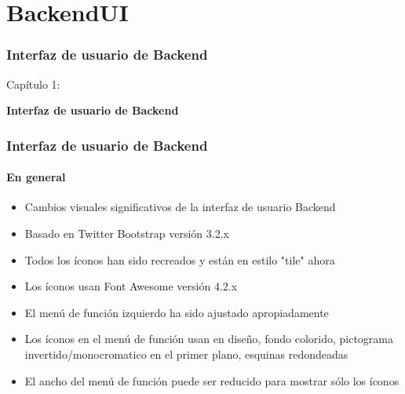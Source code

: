 %

\section{BackendUI}
\begin{frame}[fragile]
	\frametitle{Interfaz de usuario de Backend}

	\begin{center}\huge{Capítulo 1:}\end{center}
	\begin{center}\huge{\color{typo3darkgrey}\textbf{Interfaz de usuario de Backend}}\end{center}

\end{frame}


\begin{frame}[fragile]
	\frametitle{Interfaz de usuario de Backend}
	\framesubtitle{En general}

	\begin{itemize}
		\item Cambios visuales significativos de la interfaz de usuario Backend
		\item Basado en Twitter Bootstrap versión 3.2.x
		\item Todos los íconos han sido recreados y están en estilo "tile" ahora
		\item Los íconos usan Font Awesome versión 4.2.x
		\item El menú de función izquierdo ha sido ajustado apropiadamente
		\item Los íconos en el menú de función usan en diseño, fondo colorido, pictograma invertido/monocromatico en el primer plano, esquinas redondeadas
		\item El ancho del menú de función puede ser reducido para mostrar sólo los íconos

	\end{itemize}

\end{frame}

